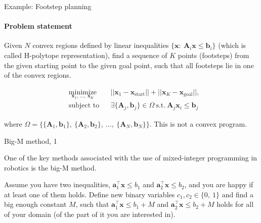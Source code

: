 \documentclass{beamer}
\begin{document}
\begin{frame}{Example: Footstep planning}
\framesubtitle{Problem statement}
\begin{flushleft}

Given $N$ convex regions defined by linear inequalities $\{ \mathbf{x}: \  \mathbf{A}_i \mathbf{x} \leq \mathbf{b}_i \}$ (which is called H-polytope representation), find a sequence of $K$ points (footsteps) from the given starting point to the given goal point, such that all footsteps lie in one of the convex regions.

\begin{equation}
\begin{aligned}
& \underset{\mathbf{x}_1, \ ..., \ \mathbf{x}_K}{\text{minimize}}
& & ||\mathbf{x}_1 - \mathbf{x}_{\text{start}}|| + ||\mathbf{x}_K - \mathbf{x}_{\text{goal}}||, \\
& \text{subject to}
& & \exists \{ \mathbf{A}_j, \mathbf{b}_j\} \in \Omega \ \text{s.t.} \ \mathbf{A}_j\mathbf{x}_i \leq \mathbf{b}_j
\end{aligned}
\end{equation}

\bigskip

where $\Omega = \{ \{ \mathbf{A}_1, \mathbf{b}_1\}, \ \{ \mathbf{A}_2, \mathbf{b}_2\}, \ ..., \ \{ \mathbf{A}_N, \mathbf{b}_N\} \}$. This is not a convex program.
 
\end{flushleft}
\end{frame}




\begin{frame}{Big-M method, 1}
\begin{flushleft}


One of the key methods associated with the use of mixed-integer programming in robotics is the big-M method. 

\bigskip

Assume you have two inequalities, $\mathbf{a}_1^\top \mathbf{x} \leq b_1$ and $\mathbf{a}_2^\top \mathbf{x} \leq b_2$, and you are happy if at least one of them holds. Define new binary variables $c_1, c_2 \in \{0, \ 1 \}$ and find a big enough constant $M$, such that $\mathbf{a}_1^\top \mathbf{x} \leq b_1 + M$ and $\mathbf{a}_2^\top \mathbf{x} \leq b_2 + M$ holds for all of your domain (of the part of it you are interested in).



\begin{figure} [h!]
	\begin{center}
		
	\end{center} 
\end{figure}

\end{flushleft}
\end{frame}
\end{document}
